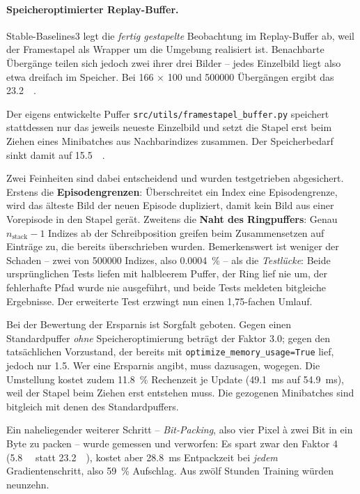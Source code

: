 \paragraph{Speicheroptimierter Replay-Buffer.}
Stable-Baselines3 legt die \emph{fertig gestapelte} Beobachtung im Replay-Buffer ab, weil der Framestapel als Wrapper um die Umgebung realisiert ist. Benachbarte Übergänge teilen sich jedoch zwei ihrer drei Bilder -- jedes Einzelbild liegt also etwa dreifach im Speicher. Bei \num{166} $\times$ \num{100} und \num{500000} Übergängen ergibt das \SI{23.2}{\giga\byte}.

Der eigens entwickelte Puffer \texttt{src/utils/framestapel\_buffer.py} speichert stattdessen nur das jeweils neueste Einzelbild und setzt die Stapel erst beim Ziehen eines Minibatches aus Nachbarindizes zusammen. Der Speicherbedarf sinkt damit auf \SI{15.5}{\giga\byte}.

Zwei Feinheiten sind dabei entscheidend und wurden testgetrieben abgesichert. Erstens die \textbf{Episodengrenzen}: Überschreitet ein Index eine Episodengrenze, wird das älteste Bild der neuen Episode dupliziert, damit kein Bild aus einer Vorepisode in den Stapel gerät. Zweitens die \textbf{Naht des Ringpuffers}: Genau $n_{\text{stack}}-1$ Indizes ab der Schreibposition greifen beim Zusammensetzen auf Einträge zu, die bereits überschrieben wurden. Bemerkenswert ist weniger der Schaden -- zwei von \num{500000} Indizes, also \SI{0.0004}{\percent} -- als die \emph{Testlücke}: Beide ursprünglichen Tests liefen mit halbleerem Puffer, der Ring lief nie um, der fehlerhafte Pfad wurde nie ausgeführt, und beide Tests meldeten bitgleiche Ergebnisse. Der erweiterte Test erzwingt nun einen 1,75-fachen Umlauf.

Bei der Bewertung der Ersparnis ist Sorgfalt geboten. Gegen einen Standardpuffer \emph{ohne} Speicheroptimierung beträgt der Faktor \num{3.0}; gegen den tatsächlichen Vorzustand, der bereits mit \texttt{optimize\_memory\_usage=True} lief, jedoch nur \num{1.5}. Wer eine Ersparnis angibt, muss dazusagen, wogegen. Die Umstellung kostet zudem \SI{11.8}{\percent} Rechenzeit je Update (\SI{49.1}{\milli\second} auf \SI{54.9}{\milli\second}), weil der Stapel beim Ziehen erst entstehen muss. Die gezogenen Minibatches sind bitgleich mit denen des Standardpuffers.

Ein naheliegender weiterer Schritt -- \emph{Bit-Packing}, also vier Pixel à zwei Bit in ein Byte zu packen -- wurde gemessen und verworfen: Es spart zwar den Faktor \num{4} (\SI{5.8}{\giga\byte} statt \SI{23.2}{\giga\byte}), kostet aber \SI{28.8}{\milli\second} Entpackzeit bei \emph{jedem} Gradientenschritt, also \SI{59}{\percent} Aufschlag. Aus zwölf Stunden Training würden neunzehn.

